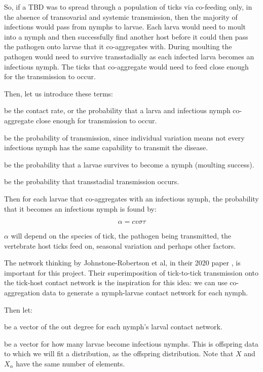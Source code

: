 \documentclass{article}
\begin{document}
So, if a TBD was to spread through a population of ticks via co-feeding only, in the absence of transovarial and systemic transmission, then the majority of infections would pass from nymphs to larvae. Each larva would need to moult into a nymph and then successfully find another host before it could then pass the pathogen onto larvae that it co-aggregates with. During moulting the pathogen would need to survive transstadially as each infected larva becomes an infectious nymph. The ticks that co-aggregate would need to feed close enough for the transmission to occur.

Then, let us introduce these terms:

\begin{description}[leftmargin=1cm, style=nextline]
    \item[$ c $] be the contact rate, or the probability that a larva and infectious nymph co-aggregate close enough for transmission to occur.
    \item[$ v $] be the probability of transmission, since individual variation means not every infectious nymph has the same capability to transmit the disease.
    \item[$ \sigma $] be the probability that a larvae survives to become a nymph (moulting success).
    \item[$ \tau $] be the probability that transstadial transmission occurs.
\end{description}

Then for each larvae that co-aggregates with an infectious nymph, the probability that it becomes an infectious nymph is found by:

\begin{equation} \label{alphaDef}
    \alpha = c v \sigma \tau
\end{equation}

$ \alpha $ will depend on the species of tick, the pathogen being transmitted, the vertebrate host ticks feed on, seasonal variation and perhaps other factors.

The network thinking by Johnstone-Robertson et al, in their 2020 paper \cite{JohnstoneRobertson2020}, is important for this project. Their superimposition of tick-to-tick transmission onto the tick-host contact network is the inspiration for this idea: we can use co-aggregation data to generate a nymph-larvae contact network for each nymph.

Then let:
\begin{description}[leftmargin=1cm, style=nextline]
    \item[$ X $] be a vector of the out degree for each nymph's larval contact network.
    \item[$ X_\alpha $] be a vector for how many larvae become infectious nymphs. This is offspring data to which we will fit a distribution, as the offspring distribution. Note that $ X $ and $ X_\alpha $ have the same number of elements. 
\end{description}
\end{document}
